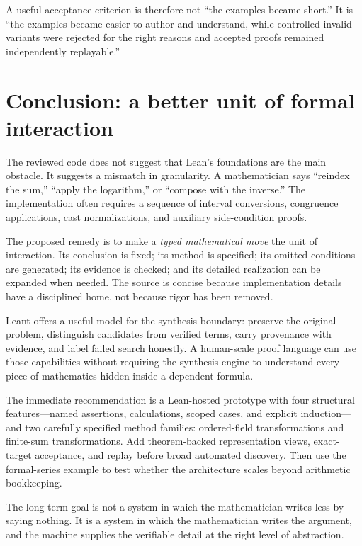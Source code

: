 \documentclass[11pt,a4paper]{article}
\begin{document}
A useful acceptance criterion is therefore not ``the examples became short.'' It is ``the examples became easier to author and understand, while controlled invalid variants were rejected for the right reasons and accepted proofs remained independently replayable.''

\section{Conclusion: a better unit of formal interaction}

The reviewed code does not suggest that Lean's foundations are the main obstacle. It suggests a mismatch in granularity. A mathematician says ``reindex the sum,'' ``apply the logarithm,'' or ``compose with the inverse.'' The implementation often requires a sequence of interval conversions, congruence applications, cast normalizations, and auxiliary side-condition proofs.

The proposed remedy is to make a \emph{typed mathematical move} the unit of interaction. Its conclusion is fixed; its method is specified; its omitted conditions are generated; its evidence is checked; and its detailed realization can be expanded when needed. The source is concise because implementation details have a disciplined home, not because rigor has been removed.

Leant offers a useful model for the synthesis boundary: preserve the original problem, distinguish candidates from verified terms, carry provenance with evidence, and label failed search honestly. A human-scale proof language can use those capabilities without requiring the synthesis engine to understand every piece of mathematics hidden inside a dependent formula.

The immediate recommendation is a Lean-hosted prototype with four structural features---named assertions, calculations, scoped cases, and explicit induction---and two carefully specified method families: ordered-field transformations and finite-sum transformations. Add theorem-backed representation views, exact-target acceptance, and replay before broad automated discovery. Then use the formal-series example to test whether the architecture scales beyond arithmetic bookkeeping.

The long-term goal is not a system in which the mathematician writes less by saying nothing. It is a system in which the mathematician writes the argument, and the machine supplies the verifiable detail at the right level of abstraction.
\end{document}
